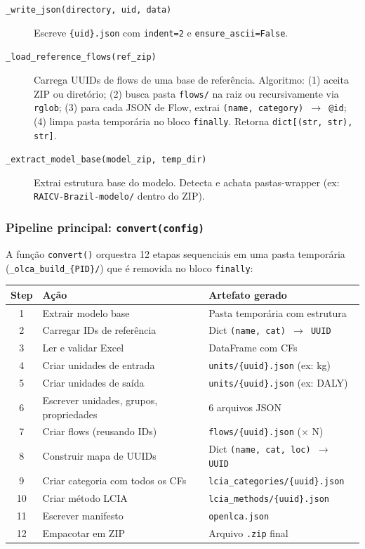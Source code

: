 \begin{description}
    \item[\texttt{\_write\_json(directory, uid, data)}] Escreve \texttt{\{uid\}.json} com \texttt{indent=2} e \texttt{ensure\_ascii=False}.

    \item[\texttt{\_load\_reference\_flows(ref\_zip)}] Carrega UUIDs de flows de uma base de refer\^encia. Algoritmo: (1) aceita ZIP ou diret\'orio; (2) busca pasta \texttt{flows/} na raiz ou recursivamente via \texttt{rglob}; (3) para cada JSON de Flow, extrai \texttt{(name, category) $\rightarrow$ @id}; (4) limpa pasta tempor\'aria no bloco \texttt{finally}. Retorna \texttt{dict[(str, str), str]}.

    \item[\texttt{\_extract\_model\_base(model\_zip, temp\_dir)}] Extrai estrutura base do modelo. Detecta e achata pastas-wrapper (ex: \texttt{RAICV-Brazil-modelo/} dentro do ZIP).
\end{description}

\subsubsection{Pipeline principal: \texttt{convert(config)}}

A fun\c{c}\~ao \texttt{convert()} orquestra 12 etapas sequenciais em uma pasta tempor\'aria (\texttt{\_olca\_build\_\{PID\}/}) que \'e removida no bloco \texttt{finally}:

\begin{table}[H]
\centering
\small
\begin{tabularx}{\textwidth}{clX}
\toprule
\textbf{Step} & \textbf{A\c{c}\~ao} & \textbf{Artefato gerado} \\
\midrule
1 & Extrair modelo base & Pasta tempor\'aria com estrutura \\
2 & Carregar IDs de refer\^encia & Dict \texttt{(name, cat) $\rightarrow$ UUID} \\
3 & Ler e validar Excel & DataFrame com CFs \\
4 & Criar unidades de entrada & \texttt{units/\{uuid\}.json} (ex: kg) \\
5 & Criar unidades de sa\'ida & \texttt{units/\{uuid\}.json} (ex: DALY) \\
6 & Escrever unidades, grupos, propriedades & 6 arquivos JSON \\
7 & Criar flows (reusando IDs) & \texttt{flows/\{uuid\}.json} ($\times$ N) \\
8 & Construir mapa de UUIDs & Dict \texttt{(name, cat, loc) $\rightarrow$ UUID} \\
9 & Criar categoria com todos os CFs & \texttt{lcia\_categories/\{uuid\}.json} \\
10 & Criar m\'etodo LCIA & \texttt{lcia\_methods/\{uuid\}.json} \\
11 & Escrever manifesto & \texttt{openlca.json} \\
12 & Empacotar em ZIP & Arquivo \texttt{.zip} final \\
\bottomrule
\end{tabularx}
\end{table}


